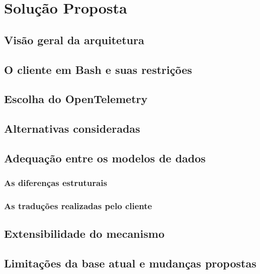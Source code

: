
\chapter{Solução Proposta}

\label{cap:solucao}

\section{Visão geral da arquitetura}

\section{O cliente em Bash e suas restrições}

\section{Escolha do OpenTelemetry}

\section{Alternativas consideradas}
\label{sec:alternativas}

\section{Adequação entre os modelos de dados}

\subsection{As diferenças estruturais}

\subsection{As traduções realizadas pelo cliente}

\section{Extensibilidade do mecanismo}
\label{sec:extensibilidade}

\section{Limitações da base atual e mudanças propostas}
